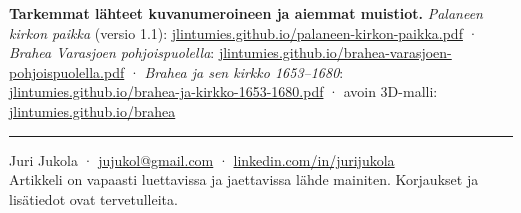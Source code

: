 \documentclass[11pt,a4paper]{article}
\begin{document}
\vspace{0.6em}
{\small\raggedright\textbf{Tarkemmat lähteet kuvanumeroineen ja aiemmat muistiot.} \textit{Palaneen kirkon paikka} (versio 1.1): \href{https://jlintumies.github.io/palaneen-kirkon-paikka.pdf}{jlintumies.github.io/palaneen-kirkon-paikka.pdf} · \textit{Brahea Varasjoen pohjoispuolella}: \href{https://jlintumies.github.io/brahea-varasjoen-pohjoispuolella.pdf}{jlintumies.github.io/brahea-varasjoen-pohjoispuolella.pdf} · \textit{Brahea ja sen kirkko 1653--1680}: \href{https://jlintumies.github.io/brahea-ja-kirkko-1653-1680.pdf}{jlintumies.github.io/brahea-ja-kirkko-1653-1680.pdf} · avoin 3D-malli: \href{https://jlintumies.github.io/brahea/}{jlintumies.github.io/brahea}\par}

\vspace{0.8em}
{\color{leima}\rule{\linewidth}{0.5pt}}

{\small\sffamily Juri Jukola · \href{mailto:jujukol@gmail.com}{jujukol@gmail.com} · \href{https://www.linkedin.com/in/jurijukola}{linkedin.com/in/jurijukola}\\
Artikkeli on vapaasti luettavissa ja jaettavissa lähde mainiten. Korjaukset ja lisätiedot ovat tervetulleita.\par}
\end{document}
